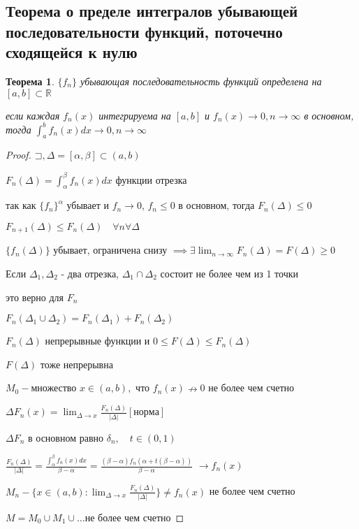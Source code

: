 \documentclass[a4paper]{article}
\newcommand\letsymbol{\mathord{\sqsupset}}
\newtheorem{theorem}{Теорема}[section]
\theoremstyle{definition}
\theoremstyle{remark}
\begin{document}
    \subsection{ Теорема о пределе интегралов убывающей последовательности функций, поточечно сходящейся к нулю}
    \begin{theorem}
     $\{f_n\}$ убывающая последовательность функций определена на $[a,b]\subset \mathbb{R} $

     если каждая $f_n(x)$ интегрируема на $[a,b]$ и $f_n(x)\to 0, n\to\infty$ в основном, тогда
     $\int_a^b f_n(x)dx \to 0, n\to\infty$
\end{theorem}
\begin{proof}
     $\letsymbol{}, \Delta = [\alpha, \beta]\subset (a, b)$

     $F_n(\Delta) = \int_\alpha^\beta f_n(x)dx$ функции отрезка

     так как $\{f_n\}^\alpha$ убывает и $f_n\to0$, $f_n\leq 0$ в основном, тогда $F_n(\Delta)\leq 0$

     $F_{n+1}(\Delta) \leq F_n(\Delta)\quad \forall n \forall \Delta$

     $\{f_n(\Delta)\}$ убывает, ограничена снизу
     $\implies\exists\lim_{n\to\infty}F_n(\Delta) = F(\Delta)\geq 0$

     Если $\Delta_1, \Delta_2$ - два отрезка, $\Delta_1\cap\Delta_2$ состоит
     не более чем из 1 точки
     
     это верно для $F_n$

     $F_n(\Delta_1 \cup\Delta_2) = F_n(\Delta_1)+F_n(\Delta_2)$

     $F_n(\Delta)$ непрерывные функции и $0\leq F(\Delta) \leq F_n(\Delta)$

     $F(\Delta)$ тоже непрерывна

     $M_0 - $множество $x\in(a, b),$ что $f_n(x)\nrightarrow 0$ не более чем счетно

     $\Delta F_n(x) = \lim_{\Delta\to x} \frac{F_n(\Delta)}{|\Delta|}[норма]$

     $\Delta F_n$ в основном равно $\delta_n, \quad t\in(0, 1)$

     $\frac{F_n(\Delta)}{|\Delta|} = \frac{\int_\alpha^\beta f_n(x)dx}{\beta - \alpha} = \frac{(\beta-\alpha)f_n(\alpha + t(\beta-\alpha))}{\beta-\alpha}$
     $\to f_n(x)$

     $M_n - \{x\in(a,b):\lim_{\Delta\to x}\frac{F_n(\Delta)}{|\Delta|}\}\neq f_n(x)$ не более
     чем счетно
     
     $M = M_0\cup M_1\cup \dots $не более чем счетно


\end{proof}
\end{document}
